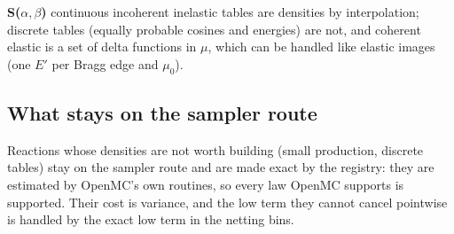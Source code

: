 \textbf{S($\alpha,\beta$)} continuous incoherent inelastic tables are densities by interpolation;
discrete tables (equally probable cosines and energies) are not, and coherent elastic is a set of
delta functions in $\mu$, which can be handled like elastic images (one $E'$ per Bragg edge and
$\mu_0$).

\subsection{What stays on the sampler route}

Reactions whose densities are not worth building (small production, discrete tables) stay on the
sampler route and are made exact by the registry: they are estimated by OpenMC's own routines, so
every law OpenMC supports is supported. Their cost is variance, and the low term they cannot cancel
pointwise is handled by the exact low term in the netting bins.
